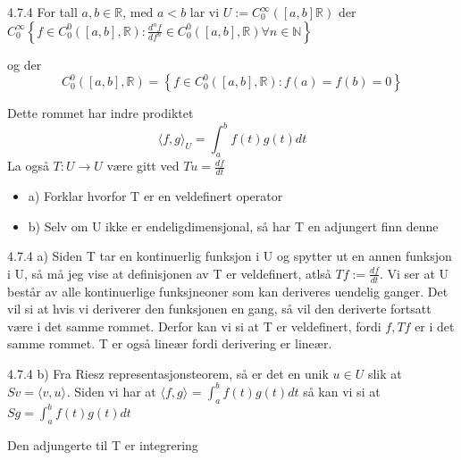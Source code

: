 \documentclass[a4paper,norsk]{article}
\begin{document}
\begin{oppgavebox}{4.7.4}{}
For tall $ a,b \in \mathbb{R} $, med $ a < b $  lar vi $ U:= C_0^{\infty} \left( \left[ a, b \right] \mathbb{R} \right)   $ der $ C_0^{\infty} \left\{ f \in C_0^0 \left( \left[ a, b \right], \mathbb{R} \right) : \frac{ d^n f }{ df^n } \in C_0^0 \left( \left[ a, b \right], \mathbb{R}  \right) \forall n \in \mathbb{N} \right\}  $


og der 
\[
    C_0^0 \left( \left[ a, b \right] , \mathbb{R} \right)  = \left\{ f \in C_0^0 \left( \left[ a, b \right] , \mathbb{R} \right): f(a) = f(b) = 0 \right\} 
\]

Dette rommet har indre prodiktet \[
    \langle f, g \rangle_{ U } = \int_{a}^{b} f(t) g(t) dt 
\]
La også $ T:U \rightarrow U$ være gitt ved $Tu =  \frac{ df }{ dt }$

\begin{itemize}
    \item a) Forklar hvorfor T er en veldefinert operator
    \item b) Selv om U ikke er endeligdimensjonal, så har T en adjungert finn denne
\end{itemize}


\begin{proofbox}{4.7.4 a)}{}
Siden T tar en kontinuerlig funksjon i U og spytter ut en annen funksjon i U, så må jeg vise at definisjonen av T er veldefinert, atlså $ Tf := \frac{ df }{ dt }$. Vi ser at U består av alle kontinuerlige funksjneoner som kan deriveres uendelig ganger. Det vil si at hvis vi deriverer den funksjonen en gang, så vil den deriverte fortsatt være i det samme rommet. Derfor kan vi si at T er veldefinert, fordi $ f, Tf $ er i det samme rommet. T er også lineær fordi derivering er lineær.
\end{proofbox}

\begin{proofbox}{4.7.4 b)}{}
Fra Riesz representasjonsteorem, så er det en unik $ u \in U $ slik at $ Sv = \langle v, u \rangle_{  }  $. Siden vi har at $ \langle f,g  \rangle_{  } = \int_{a}^{b} f(t)g(t) dt   $ så kan vi si at $ Sg = \int_{a}^{b} f(t) g(t) dt $

Den adjungerte til T er integrering
\end{proofbox}
\end{oppgavebox}
\end{document}
